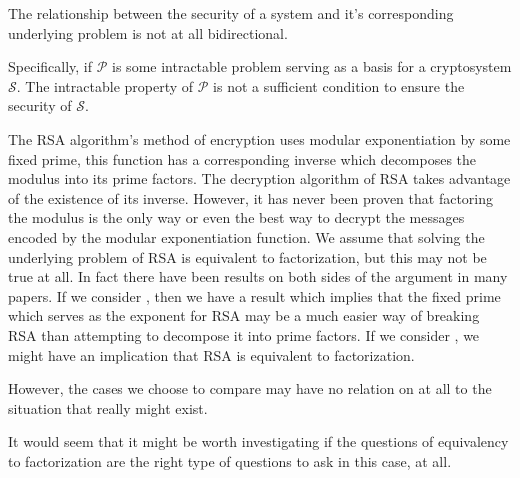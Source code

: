 The relationship between the security of a system and it's corresponding underlying problem is not at all bidirectional. 

Specifically, if $\mathcal{P}$ is some intractable problem serving as a basis for a cryptosystem $\mathcal{S}$. The intractable property of $\mathcal{P}$ is not a sufficient condition to ensure the security of $\mathcal{S}$. 

\bigskip

\begin{exmp}
    
    The RSA algorithm's method of encryption uses modular exponentiation by some fixed prime, this function has a corresponding inverse which decomposes the modulus into its prime factors. The decryption algorithm of RSA takes advantage of the existence of its inverse. 
\smallskip
    However, it has never been proven that factoring the modulus is the only way or even the best way to decrypt the messages encoded by the modular exponentiation function. 
\smallskip
    We assume that solving the underlying problem of RSA is equivalent to factorization, but this may not be true at all. 
\smallskip
    In fact there have been results on both sides of the argument in many papers. If we consider \cite{Bon1998}, then we have a result which implies that the fixed prime which serves as the exponent for RSA may be a much easier way of breaking RSA than attempting to decompose it into prime factors. If we consider \cite{Bro2005}, we might have an implication that RSA is equivalent to factorization. 

\medskip 
However, the cases we choose to compare may have no relation on at all to the situation that really might exist. 
\end{exmp}

It would seem that it might be worth investigating if the questions of equivalency to factorization are the right type of questions to ask in this case, at all.
    